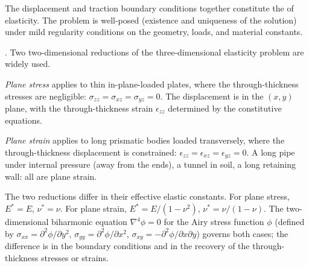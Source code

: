 The displacement and traction boundary conditions together
constitute the  of elasticity. The
problem is well-posed (existence and uniqueness of the solution)
under mild regularity conditions on the geometry, loads, and
material constants.

. Two two-dimensional
reductions of the three-dimensional elasticity problem are widely
used.

\emph{Plane stress} applies to thin in-plane-loaded plates, where
the through-thickness stresses are negligible: $\sigma_{zz} =
\sigma_{xz} = \sigma_{yz} = 0$. The displacement is in the $(x, y)$
plane, with the through-thickness strain $\epsilon_{zz}$ determined
by the constitutive equations.

\emph{Plane strain} applies to long prismatic bodies loaded
transversely, where the through-thickness displacement is
constrained: $\epsilon_{zz} = \epsilon_{xz} = \epsilon_{yz} = 0$.
A long pipe under internal pressure (away from the ends), a tunnel
in soil, a long retaining wall: all are plane strain.

The two reductions differ in their effective elastic constants. For
plane stress, $E^* = E$, $\nu^* = \nu$. For plane strain, $E^* =
E/(1 - \nu^2)$, $\nu^* = \nu/(1-\nu)$. The two-dimensional
biharmonic equation $\nabla^4 \phi = 0$ for the Airy stress
function $\phi$ (defined by $\sigma_{xx} = \partial^2\phi/\partial
y^2$, $\sigma_{yy} = \partial^2\phi/\partial x^2$, $\sigma_{xy} =
-\partial^2\phi/\partial x\partial y$) governs both cases; the
difference is in the boundary conditions and in the recovery of
the through-thickness stresses or strains.

